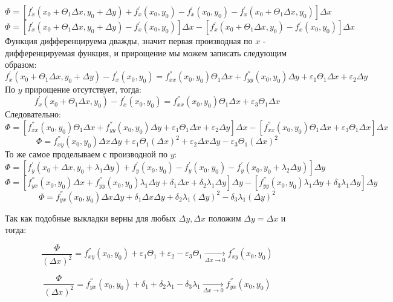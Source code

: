 $$
\Phi = [f_x^{'}(x_0 + \Theta_1\Delta x, y_0 + \Delta y) + f_{x}^{'}(x_0, y_0) - f_{x}^{'}(x_0, y_0) - f_x^{'}(x_0 + \Theta_1\Delta x, y_0)]\Delta x
$$
$$
\Phi = [f_x^{'}(x_0 + \Theta_1\Delta x, y_0 + \Delta y) - f_{x}^{'}(x_0, y_0)]\Delta x - [f_x^{'}(x_0 + \Theta_1\Delta x, y_0) - f_{x}^{'}(x_0, y_0)]\Delta x
$$
Функция дифференцируема дважды, значит первая производная по $x$ - дифференцируемая функция, и прирощение мы можем записать следующим образом:
$$
f_x^{'}(x_0 + \Theta_1\Delta x, y_0 + \Delta y) - f_{x}^{'}(x_0, y_0) = f_{x x}^{''}(x_0, y_0)\Theta_1\Delta x + f_{y y}^{''}(x_0, y_0)\Delta y + \varepsilon_1\Theta_1\Delta x + \varepsilon_2 \Delta y
$$
По $y$ прирощение отсутствует, тогда:
$$
f_x^{'}(x_0 + \Theta_1\Delta x, y_0) - f_{x}^{'}(x_0, y_0) = f_{x x}^{''}(x_0, y_0)\Theta_1\Delta x + \varepsilon_3\Theta_1\Delta x
$$
Следовательно:
$$
\Phi =  [f_{x x}^{''}(x_0, y_0)\Theta_1\Delta x + f_{y y}^{''}(x_0, y_0)\Delta y + \varepsilon_1\Theta_1\Delta x + \varepsilon_2 \Delta y] \Delta x - [f_{x x}^{''}(x_0, y_0)\Theta_1\Delta x + \varepsilon_3\Theta_1\Delta x] \Delta x
$$
$$ 
\Phi = f_{x y}^{''}(x_0, y_0)\Delta x\Delta y + \varepsilon_1\Theta_1(\Delta x)^2 + \varepsilon_2 \Delta x\Delta y - \varepsilon_3\Theta_1(\Delta x)^2
$$
То же самое проделываем с производной по $y$:
$$
\Phi = [f_y^{'}(x_0 + \Delta x, y_0 + \lambda_1\Delta y) + f_{y}^{'}(x_0, y_0) - f_{y}^{'}(x_0, y_0) - f_y^{'}(x_0, y_0+ \lambda_2\Delta y)]\Delta y
$$
$$
\Phi = [f_{y x}^{''}(x_0, y_0)\Delta x + f_{y y}^{''}(x_0, y_0)\lambda_1\Delta y + \delta_1\Delta x + \delta_2\lambda_1\Delta y]\Delta y - [f_{y y}^{''}(x_0, y_0)\lambda_1\Delta y+ \delta_3\lambda_1\Delta y]\Delta y
$$
$$
\Phi = f_{y x}^{''}(x_0, y_0)\Delta x\Delta y + \delta_1\Delta x\Delta y + \delta_2\lambda_1(\Delta y)^2 - \delta_3\lambda_1(\Delta y)^2
$$

Так как подобные выкладки верны для любых $\Delta y,\Delta x$ положим $\Delta y = \Delta x$ и тогда:

$$
\frac{\Phi}{(\Delta x)^2} = f_{x y}^{''}(x_0, y_0) + \varepsilon_1\Theta_1 + \varepsilon_2  - \varepsilon_3\Theta_1\underset{\Delta x \to 0}{\longrightarrow} f_{x y}^{''}(x_0, y_0)
$$ 

$$
\frac{\Phi}{(\Delta x)^2} = f_{y x}^{''}(x_0, y_0) + \delta_1 + \delta_2\lambda_1 - \delta_3\lambda_1 \underset{\Delta x \to 0}{\longrightarrow} f_{y x}^{''}(x_0, y_0)
$$
